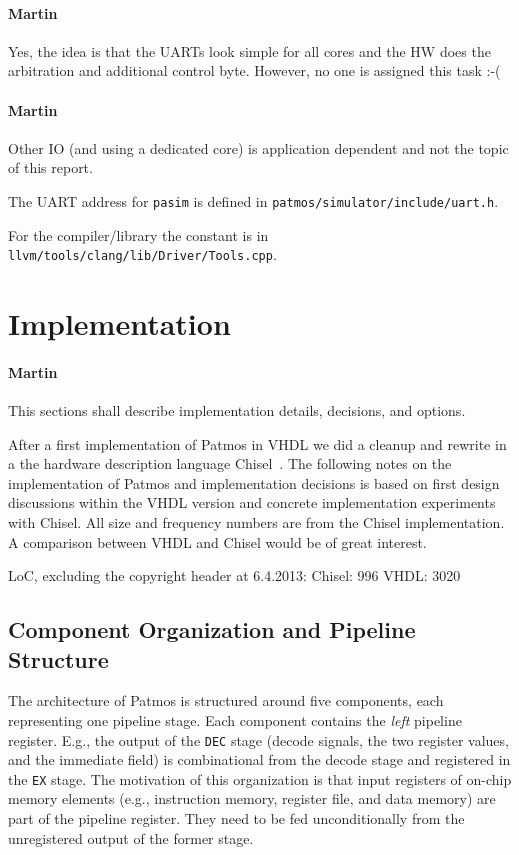\documentclass{IEEEtran}
\newcommand{\code}[1]{{\texttt{#1}}}
\newcommand{\comment}[3]{\paragraph*{\textbf{#1}}{\color{#3}#2}}
\newcommand{\martin}[1]{\comment{Martin}{#1}{Blue}}
\begin{document}
\martin{Yes, the idea is that the UARTs look simple for all cores and the HW does the arbitration and additional control byte. However, no one is assigned this task :-(}

\martin{Other IO (and using a dedicated core) is application dependent and not the topic of this report.}




The UART address for \code{pasim} is defined in \code{patmos/simulator/include/uart.h}.

For the compiler/library the constant is in \code{llvm/tools/clang/lib/Driver/Tools.cpp}.

\section{Implementation}

\martin{This sections shall describe implementation details,
decisions, and options.}

After a first implementation of Patmos in VHDL we did a cleanup and
rewrite in a the hardware description language Chisel~\cite{chisel:dac2012}.
The following notes on the implementation of Patmos and implementation
decisions is based on first design discussions within the VHDL version
and concrete implementation experiments with Chisel. All size and frequency
numbers are from the Chisel implementation. A comparison between VHDL
and Chisel would be of great interest.

LoC, excluding the copyright header at 6.4.2013:
Chisel: 996
VHDL: 3020

\subsection{Component Organization and Pipeline Structure}

The architecture of Patmos is structured around five components, each
representing one pipeline stage. Each component contains the \emph{left}
pipeline register. E.g., the output of the \code{DEC} stage (decode signals,
the two register values, and the immediate field) is combinational from
the decode stage and registered in the \code{EX} stage. The motivation of
this organization is that input registers of on-chip memory elements (e.g., instruction
memory, register file, and data memory) are part of the pipeline register.
They need to be fed unconditionally from the unregistered output of
the former stage.
\end{document}
